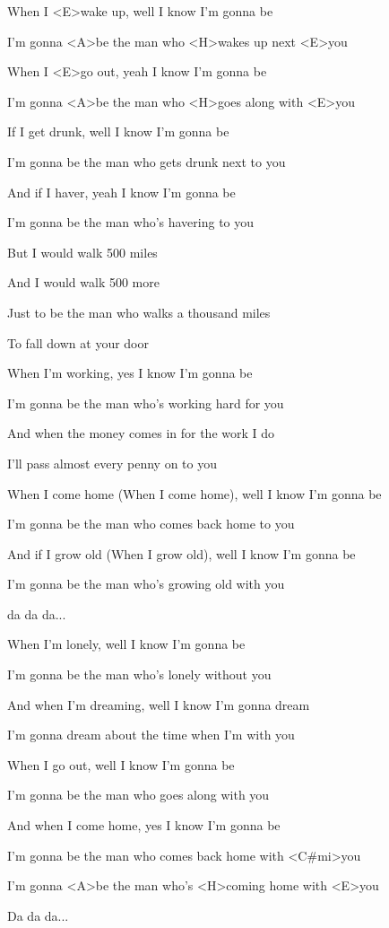 

\zs
When I <E>wake up, well I know I'm gonna be

I'm gonna <A>be the man who <H>wakes up next <E>you

When I <E>go out, yeah I know I'm gonna be

I'm gonna <A>be the man who <H>goes along with <E>you

\ks

\zs
If I get drunk, well I know I'm gonna be

I'm gonna be the man who gets drunk next to you

And if I haver, yeah I know I'm gonna be

I'm gonna be the man who's havering to you
\ks

\zr
But I would walk 500 miles

And I would walk 500 more

Just to be the man who walks a thousand miles

To fall down at your door
\kr

\zs
When I'm working, yes I know I'm gonna be

I'm gonna be the man who's working hard for you

And when the money comes in for the work I do

I'll pass almost every penny on to you
\ks

\zs
When I come home (When I come home), well I know I'm gonna be

I'm gonna be the man who comes back home to you

And if I grow old (When I grow old), well I know I'm gonna be

I'm gonna be the man who's growing old with you
\ks

\zr \kr

da da da...


\zs
When I'm lonely, well I know I'm gonna be

I'm gonna be the man who's lonely without you

And when I'm dreaming, well I know I'm gonna dream

I'm gonna dream about the time when I'm with you
\ks

\zs
When I go out, well I know I'm gonna be

I'm gonna be the man who goes along with you

And when I come home, yes I know I'm gonna be

I'm gonna be the man who comes back home with <C#mi>you

I'm gonna <A>be the man who's <H>coming home with <E>you
\ks

\zr \kr

Da da da...

\zr \kr
\kp
